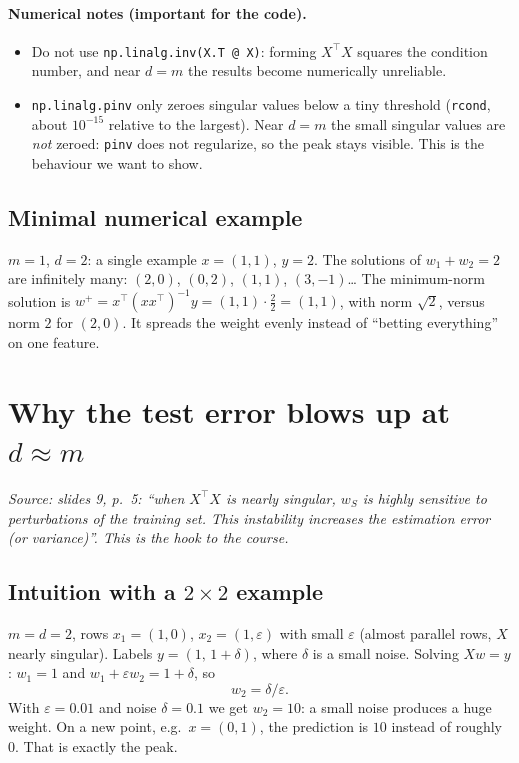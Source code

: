 \documentclass[11pt,a4paper]{article}
\newcommand{\fonte}[1]{\par\noindent\textit{Source: #1}\par\smallskip}
\begin{document}
\paragraph{Numerical notes (important for the code).}
\begin{itemize}
  \item Do not use \texttt{np.linalg.inv(X.T @ X)}: forming $X^\top X$ squares the condition number, and near $d=m$
        the results become numerically unreliable.
  \item \texttt{np.linalg.pinv} only zeroes singular values below a tiny threshold (\texttt{rcond}, about $10^{-15}$
        relative to the largest). Near $d=m$ the small singular values are \emph{not} zeroed: \texttt{pinv} does not
        regularize, so the peak stays visible. This is the behaviour we want to show.
\end{itemize}

\subsection{Minimal numerical example}
$m=1$, $d=2$: a single example $x = (1,1)$, $y = 2$. The solutions of $w_1 + w_2 = 2$ are infinitely many: $(2,0)$,
$(0,2)$, $(1,1)$, $(3,-1)$\dots{} The minimum-norm solution is $w^{+} = x^\top(xx^\top)^{-1}y = (1,1)\cdot\frac{2}{2} = (1,1)$,
with norm $\sqrt{2}$, versus norm $2$ for $(2,0)$. It spreads the weight evenly instead of ``betting everything'' on
one feature.

\section{Why the test error blows up at $d \approx m$}
\fonte{slides 9, p.~5: ``when $X^\top X$ is nearly singular, $w_S$ is highly sensitive to perturbations of the training
set. This instability increases the estimation error (or variance)''. This is the hook to the course.}

\subsection{Intuition with a $2\times 2$ example}
$m = d = 2$, rows $x_1 = (1,0)$, $x_2 = (1,\varepsilon)$ with small $\varepsilon$ (almost parallel rows, $X$ nearly
singular). Labels $y = (1,\, 1+\delta)$, where $\delta$ is a small noise.
Solving $Xw = y$: $w_1 = 1$ and $w_1 + \varepsilon w_2 = 1+\delta$, so
\[ w_2 = \delta/\varepsilon . \]
With $\varepsilon = 0.01$ and noise $\delta = 0.1$ we get $w_2 = 10$: a small noise produces a huge weight.
On a new point, e.g.\ $x = (0,1)$, the prediction is $10$ instead of roughly $0$. That is exactly the peak.
\end{document}
